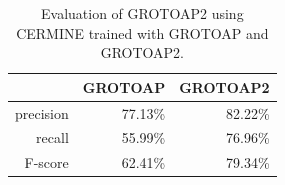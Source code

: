 \begin{table}[]
\centering
\begin{tabular}{@{}rrr@{}}
\toprule
& GROTOAP & GROTOAP2 \\
\midrule
precision & 77.13\% & 82.22\% \\
recall & 55.99\% & 76.96\% \\
F-score & 62.41\% & 79.34\% \\
\bottomrule
\end{tabular}
\caption{Evaluation of GROTOAP2 using CERMINE trained with GROTOAP and GROTOAP2.}
\label{tab:grotoap2_cermine_evaluation}
\end{table}


